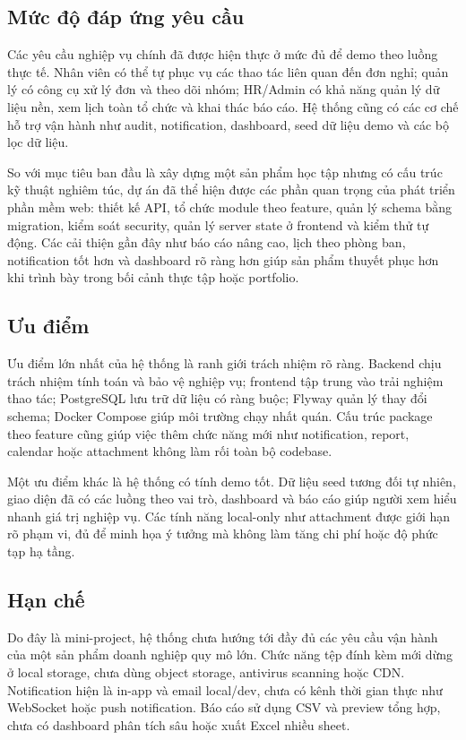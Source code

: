 \subsection{Mức độ đáp ứng yêu cầu}
Các yêu cầu nghiệp vụ chính đã được hiện thực ở mức đủ để demo theo luồng thực tế. Nhân viên có thể tự phục vụ các thao tác liên quan đến đơn nghỉ; quản lý có công cụ xử lý đơn và theo dõi nhóm; HR/Admin có khả năng quản lý dữ liệu nền, xem lịch toàn tổ chức và khai thác báo cáo. Hệ thống cũng có các cơ chế hỗ trợ vận hành như audit, notification, dashboard, seed dữ liệu demo và các bộ lọc dữ liệu.

So với mục tiêu ban đầu là xây dựng một sản phẩm học tập nhưng có cấu trúc kỹ thuật nghiêm túc, dự án đã thể hiện được các phần quan trọng của phát triển phần mềm web: thiết kế API, tổ chức module theo feature, quản lý schema bằng migration, kiểm soát security, quản lý server state ở frontend và kiểm thử tự động. Các cải thiện gần đây như báo cáo nâng cao, lịch theo phòng ban, notification tốt hơn và dashboard rõ ràng hơn giúp sản phẩm thuyết phục hơn khi trình bày trong bối cảnh thực tập hoặc portfolio.

\subsection{Ưu điểm}
Ưu điểm lớn nhất của hệ thống là ranh giới trách nhiệm rõ ràng. Backend chịu trách nhiệm tính toán và bảo vệ nghiệp vụ; frontend tập trung vào trải nghiệm thao tác; PostgreSQL lưu trữ dữ liệu có ràng buộc; Flyway quản lý thay đổi schema; Docker Compose giúp môi trường chạy nhất quán. Cấu trúc package theo feature cũng giúp việc thêm chức năng mới như notification, report, calendar hoặc attachment không làm rối toàn bộ codebase.

Một ưu điểm khác là hệ thống có tính demo tốt. Dữ liệu seed tương đối tự nhiên, giao diện đã có các luồng theo vai trò, dashboard và báo cáo giúp người xem hiểu nhanh giá trị nghiệp vụ. Các tính năng local-only như attachment được giới hạn rõ phạm vi, đủ để minh họa ý tưởng mà không làm tăng chi phí hoặc độ phức tạp hạ tầng.

\subsection{Hạn chế}
Do đây là mini-project, hệ thống chưa hướng tới đầy đủ các yêu cầu vận hành của một sản phẩm doanh nghiệp quy mô lớn. Chức năng tệp đính kèm mới dừng ở local storage, chưa dùng object storage, antivirus scanning hoặc CDN. Notification hiện là in-app và email local/dev, chưa có kênh thời gian thực như WebSocket hoặc push notification. Báo cáo sử dụng CSV và preview tổng hợp, chưa có dashboard phân tích sâu hoặc xuất Excel nhiều sheet.

